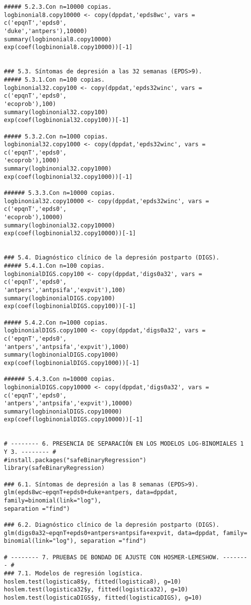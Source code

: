 \begin{Verbatim}
##### 5.2.3.Con n=10000 copias.
logbinonial8.copy10000 <- copy(dppdat,'epds8wc', vars = c('epqnT','epds0',
'duke','antpers'),10000)
summary(logbinonial8.copy10000)
exp(coef(logbinonial8.copy10000))[-1]


### 5.3. Síntomas de depresión a las 32 semanas (EPDS>9).
##### 5.3.1.Con n=100 copias.
logbinonial32.copy100 <- copy(dppdat,'epds32winc', vars = c('epqnT','epds0',
'ecoprob'),100)
summary(logbinonial32.copy100)
exp(coef(logbinonial32.copy100))[-1]

##### 5.3.2.Con n=1000 copias.
logbinonial32.copy1000 <- copy(dppdat,'epds32winc', vars = c('epqnT','epds0',
'ecoprob'),1000)
summary(logbinonial32.copy1000)
exp(coef(logbinonial32.copy1000))[-1]

###### 5.3.3.Con n=10000 copias.
logbinonial32.copy10000 <- copy(dppdat,'epds32winc', vars = c('epqnT','epds0',
'ecoprob'),10000)
summary(logbinonial32.copy10000)
exp(coef(logbinonial32.copy10000))[-1]


### 5.4. Diagnóstico clínico de la depresión postparto (DIGS).
##### 5.4.1.Con n=100 copias.
logbinonialDIGS.copy100 <- copy(dppdat,'digs0a32', vars = c('epqnT','epds0',
'antpers','antpsifa','expvit'),100)
summary(logbinonialDIGS.copy100)
exp(coef(logbinonialDIGS.copy100))[-1]

##### 5.4.2.Con n=1000 copias.
logbinonialDIGS.copy1000 <- copy(dppdat,'digs0a32', vars = c('epqnT','epds0',
'antpers','antpsifa','expvit'),1000)
summary(logbinonialDIGS.copy1000)
exp(coef(logbinonialDIGS.copy1000))[-1]

###### 5.4.3.Con n=10000 copias.
logbinonialDIGS.copy10000 <- copy(dppdat,'digs0a32', vars = c('epqnT','epds0',
'antpers','antpsifa','expvit'),10000)
summary(logbinonialDIGS.copy10000)
exp(coef(logbinonialDIGS.copy10000))[-1]


# -------- 6. PRESENCIA DE SEPARACIÓN EN LOS MODELOS LOG-BINOMIALES 1 Y 3. -------- #
#install.packages("safeBinaryRegression")
library(safeBinaryRegression)

### 6.1. Síntomas de depresión a las 8 semanas (EPDS>9).
glm(epds8wc~epqnT+epds0+duke+antpers, data=dppdat, family=binomial(link="log"), 
separation ="find")

### 6.2. Diagnóstico clínico de la depresión postparto (DIGS).
glm(digs0a32~epqnT+epds0+antpers+antpsifa+expvit, data=dppdat, family=
binomial(link="log"), separation ="find")

# -------- 7. PRUEBAS DE BONDAD DE AJUSTE CON HOSMER-LEMESHOW. -------- #
### 7.1. Modelos de regresión logística. 
hoslem.test(logistica8$y, fitted(logistica8), g=10)
hoslem.test(logistica32$y, fitted(logistica32), g=10)
hoslem.test(logisticaDIGS$y, fitted(logisticaDIGS), g=10)


\end{Verbatim}
